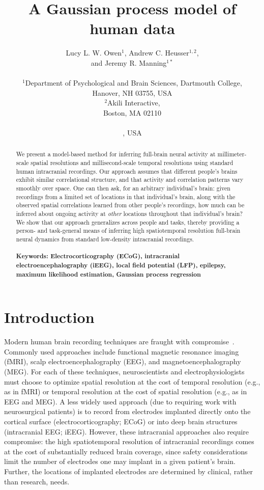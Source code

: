 \documentclass[10pt]{article}
\title{A Gaussian process model of human \DIFdelbegin \DIFdel{electrocorticographic }\DIFdelend \DIFaddbegin \DIFadd{e\-lect\-ro\-cort\-i\-co\-graph\-ic }\DIFaddend data}
\author{
  Lucy L. W. Owen$^{1}$,
  \DIFaddbegin \DIFadd{Tudor A. Muntianu$^{1}$,
  }\DIFaddend Andrew C. Heusser$^{1, 2}$, \DIFaddbegin \\
  \DIFadd{Patrick Daly$^{3}$,
  Katherine Scangos$^{3}$, }\DIFaddend and
  Jeremy R. Manning$^{1\ast}$\\\\
$^{1}$Department of Psychological and Brain Sciences, Dartmouth College,\\
Hanover, NH 03755, USA\\
$^{2}$Akili Interactive,\\
Boston, MA 02110\DIFaddbegin \DIFadd{, USA}\\
\DIFadd{$^{3}$Weill Institute for Neurosciences, University of California, San Francisco,}\\
\DIFadd{San Francisco, CA 94121}\DIFaddend , USA}
\date{}
\begin{document}
\baselineskip24pt
\maketitle

\begin{abstract}
  We present a model-based method for inferring full-brain neural
  activity at millimeter-scale spatial resolutions and
  millisecond-scale temporal resolutions using standard human
  intracranial recordings.  Our approach assumes that different
  people's brains exhibit similar correlational structure, and that
  activity and correlation patterns vary smoothly over space.  One can
  then ask, for an arbitrary individual's brain: given recordings from
  a limited set of locations in that individual's brain, along with
  the observed spatial correlations learned from other people's
  recordings, how much can be inferred about ongoing activity at
  \textit{other} locations throughout that
  individual's brain?  We show that our approach generalizes across
  people and tasks, thereby providing a person- and task-general means
  of inferring high spatiotemporal resolution full-brain neural
  dynamics from standard low-density intracranial recordings.
  \\\\
  \footnotesize{\textbf{Keywords: Electrocorticography (ECoG),
      intracranial electroencephalography (iEEG), local field
      potential (LFP), epilepsy, maximum likelihood estimation,
      Gaussian process regression}}
\end{abstract}

\section*{Introduction}
Modern human brain recording techniques are fraught with
compromise~\citep{SejnEtal14}.  Commonly used approaches include
functional magnetic resonance imaging (fMRI), scalp
electroencephalography (EEG), and magnetoencephalography (MEG).  For
each of these techniques, neuroscientists and electrophysiologists
must choose to optimize spatial resolution at the cost of temporal
resolution (e.g., as in fMRI) or temporal resolution at the cost of
spatial resolution (e.g., as in EEG and MEG).  A less widely used
approach (due to requiring work with neurosurgical patients) is to
record from electrodes implanted directly onto the cortical surface
(electrocorticography; ECoG) or into deep brain structures
(intracranial EEG; iEEG).  However, these intracranial approaches also
require compromise: the high spatiotemporal resolution of
intracranial recordings comes at the cost of substantially reduced
brain coverage, since safety considerations limit the number of
electrodes one may implant in a given patient's brain.  Further, the
locations of implanted electrodes are determined by clinical, rather
than research, needs.
\end{document}
